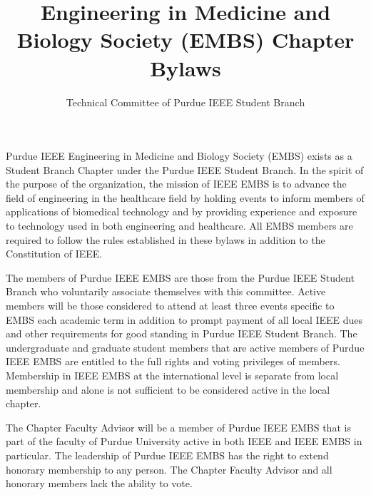 \documentclass[12pt]{constitution}
\title{Engineering in Medicine and Biology Society (EMBS) Chapter Bylaws}
\author{Technical Committee of Purdue IEEE Student Branch}
\date{}
\begin{document}

\titlecontentspage
\newpage


\label{art:namepurp}

Purdue IEEE Engineering in Medicine and Biology Society (EMBS) exists as a Student Branch Chapter under the Purdue IEEE Student Branch. In the spirit of the purpose of the organization, the mission of IEEE EMBS is to advance the field of engineering in the healthcare field  by holding events to inform members of applications of biomedical technology and by providing experience and exposure to technology used in both engineering and healthcare. All EMBS members are required to follow the rules established in these bylaws in addition to the Constitution of IEEE.


\label{art:member}

The members of Purdue IEEE EMBS are those from the Purdue IEEE Student Branch who voluntarily associate themselves with this committee. Active members will be those considered to attend at least three events specific to EMBS each academic term in addition to prompt payment of all local IEEE dues and other requirements for good standing in Purdue IEEE Student Branch. The undergraduate and graduate student members that are active members of Purdue IEEE EMBS are entitled to the full rights and voting privileges of members. Membership in IEEE EMBS at the international level is separate from local membership and alone is not sufficient to be considered active in the local chapter.

The Chapter Faculty Advisor will be a member of Purdue IEEE EMBS that is part of the faculty of Purdue University active in both IEEE and IEEE EMBS in particular. The leadership of Purdue IEEE EMBS has the right to extend honorary membership to any person. The Chapter Faculty Advisor and all honorary members lack the ability to vote.


\label{art:leader}
\end{document}
